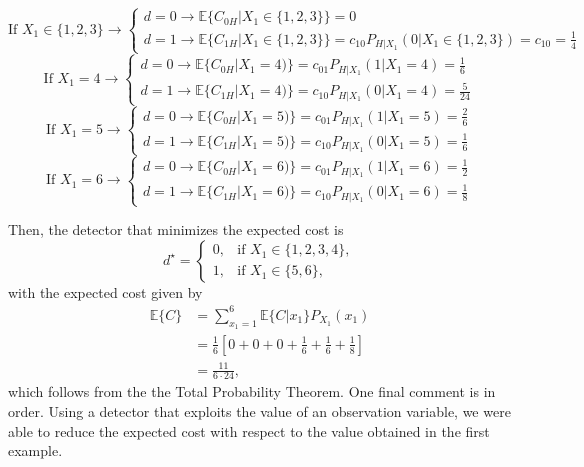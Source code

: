 \begin{solution}
\begin{itemize}
    $$\text{If } X_1 \in \{1,2,3\} \rightarrow \left\{\begin{array}{l} d=0 \rightarrow \mathbb{E}\{C_{0H}|X_1\in \{1,2,3\}\} = 0 \\ d=1 \rightarrow \mathbb{E}\{C_{1H}|X_1\in \{1,2,3\}\} = c_{10} P_{H|X_1}(0|X_1\in \{1,2,3\}) = c_{10} = \frac{1}{4}\end{array}\right.$$
    $$\text{If } X_1 =4 \rightarrow \left\{\begin{array}{l} d=0 \rightarrow \mathbb{E}\{C_{0H}|X_1=4)\} = c_{01} P_{H|X_1}(1|X_1=4) = \frac{1}{6} \\ d=1 \rightarrow \mathbb{E}\{C_{1H}|X_1=4)\} = c_{10} P_{H|X_1}(0|X_1=4) = \frac{5}{24}\end{array}\right.$$
    $$\text{If } X_1 =5 \rightarrow \left\{\begin{array}{l} d=0 \rightarrow \mathbb{E}\{C_{0H}|X_1=5)\} = c_{01} P_{H|X_1}(1|X_1=5) = \frac{2}{6} \\ d=1 \rightarrow \mathbb{E}\{C_{1H}|X_1=5)\} = c_{10} P_{H|X_1}(0|X_1=5) = \frac{1}{6}\end{array}\right.$$
    $$\text{If } X_1 =6 \rightarrow \left\{\begin{array}{l} d=0 \rightarrow \mathbb{E}\{C_{0H}|X_1=6)\} = c_{01} P_{H|X_1}(1|X_1=6) = \frac{1}{2} \\ d=1 \rightarrow \mathbb{E}\{C_{1H}|X_1=6)\} = c_{10} P_{H|X_1}(0|X_1=6) = \frac{1}{8}\end{array}\right.$$
    
    Then, the detector that minimizes the expected cost is
   \begin{equation*}
   d^\star = \begin{cases}  0, & \text{if } X_1 \in \{1,2,3,4\}, \\ 1, & \text{if } X_1 \in \{5, 6\},
   \end{cases}
   \end{equation*}
    with the expected cost given by
    \begin{align*}
        \mathbb{E}\{C\} & = \sum_{x_1=1}^6 \mathbb{E}\{C | x_1\} P_{X_1}(x_1) \\ &= \frac{1}{6}[0+ 0 +0 + \frac{1}{6} + \frac{1}{6} + \frac{1}{8}] \\ &= \frac{11}{6\cdot 24},
    \end{align*}
    which follows from the the Total Probability Theorem. One final comment is in order. Using a detector that exploits the value of an observation variable, we were able to reduce the expected cost with respect to the value obtained in the first example.
    
\end{itemize}

\end{solution}

